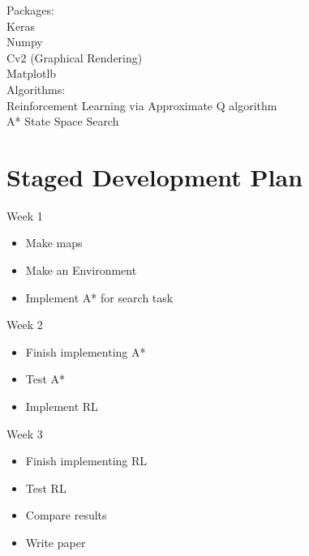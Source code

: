 \documentclass[11pt]{article}
\begin{document}
\noindent
Packages:\\
\indent Keras\\
\indent Numpy\\
\indent Cv2 (Graphical Rendering)\\
\indent Matplotlb\\


\noindent
Algorithms:\\
\indent Reinforcement Learning via Approximate Q algorithm\\
\indent A* State Space Search\\

\section{Staged Development Plan}



Week 1
\begin{itemize}[noitemsep]
  \item Make maps
  \item Make an Environment
  \item Implement A* for search task
\end{itemize}
\noindent
Week 2
\begin{itemize}[noitemsep]
    \item Finish implementing A*
    \item Test A*
    \item Implement RL
\end{itemize}
\noindent
Week 3
\begin{itemize}[noitemsep]
    \item Finish implementing RL
    \item Test RL
    \item Compare results
    \item Write paper
\end{itemize}
\end{document}
